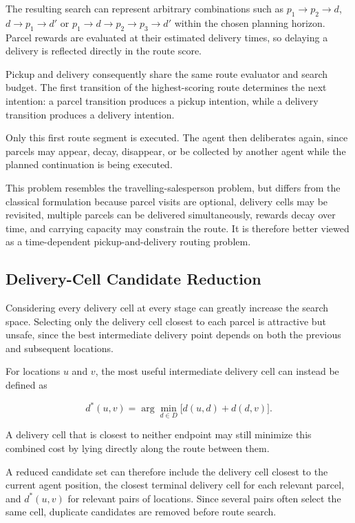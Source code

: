 \documentclass[a4paper]{article}
\begin{document}
The resulting search can represent arbitrary combinations such as
$p_1\rightarrow p_2\rightarrow d$, $d\rightarrow p_1\rightarrow d'$ or
$p_1\rightarrow d\rightarrow p_2\rightarrow p_3\rightarrow d'$ within the
chosen planning horizon. Parcel rewards are evaluated at their estimated
delivery times, so delaying a delivery is reflected directly in the route
score.

Pickup and delivery consequently share the same route evaluator and search
budget. The first transition of the highest-scoring route determines the next
intention: a parcel transition produces a pickup intention, while a delivery
transition produces a delivery intention.

Only this first route segment is executed. The agent then deliberates again,
since parcels may appear, decay, disappear, or be collected by another agent
while the planned continuation is being executed.

This problem resembles the travelling-salesperson problem, but differs from
the classical formulation because parcel visits are optional, delivery cells
may be revisited, multiple parcels can be delivered simultaneously, rewards
decay over time, and carrying capacity may constrain the route. It is therefore
better viewed as a time-dependent pickup-and-delivery routing problem.

\subsection{Delivery-Cell Candidate Reduction}

Considering every delivery cell at every stage can greatly increase the search
space. Selecting only the delivery cell closest to each parcel is attractive
but unsafe, since the best intermediate delivery point depends on both the
previous and subsequent locations.

For locations $u$ and $v$, the most useful intermediate delivery cell can
instead be defined as

\[
    d^*(u,v)
    =
    \arg\min_{d\in D}
    \bigl[d(u,d)+d(d,v)\bigr].
\]

A delivery cell that is closest to neither endpoint may still minimize this
combined cost by lying directly along the route between them.

A reduced candidate set can therefore include the delivery cell closest to
the current agent position, the closest terminal delivery cell for each
relevant parcel, and $d^*(u,v)$ for relevant pairs of locations. Since several
pairs often select the same cell, duplicate candidates are removed before
route search.
\end{document}
